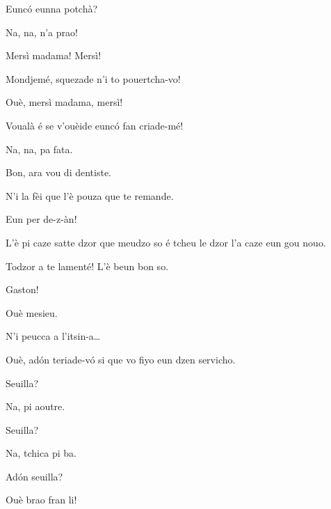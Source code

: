 \begin{drama}

\Fernandaspeaks  Eunc\'o eunna potchà?

\Gerominespeaks  Na, na, n'a prao!


\Fernandaspeaks{} Mersì madama! Mersì!


\Fernandaspeaks Mondjemé, squezade n'i to pouertcha-vo!

\Gerominespeaks{} Ouè, mersì madama, mersì!

\Fernandaspeaks Voualà é se v'ouèide eunc\'o fan criade-mé!

\Gerominespeaks Na, na, pa fata.

\Fernandaspeaks Bon, ara vou di dentiste.

\Casimirspeaks N'i la fèi que l'è pouza que te remande.

\Fernandaspeaks  Eun per de-z-àn!


\Gerominespeaks L’è pi caze satte dzor que meudzo so é tcheu le dzor l’a caze eun gou nouo.

\Casimirspeaks Todzor a te lamenté! L'è beun bon so.

\PersEmpourtantaspeaks {} Gaston!

\Eunfeurmispeaks Ouè mesieu.

\PersEmpourtantaspeaks N’i peucca a l’itsin-a\ldots

\Eunfeurmispeaks Ouè, ad\'on teriade-v\'o si que vo fiyo eun dzen servicho.


\Eunfeurmispeaks Seuilla?

\PersEmpourtantaspeaks Na, pi aoutre.

\Eunfeurmispeaks Seuilla?

\PersEmpourtantaspeaks Na, tchica pi ba.

\Eunfeurmispeaks Ad\'on seuilla?

\PersEmpourtantaspeaks Ouè brao fran li!


\end{drama}

